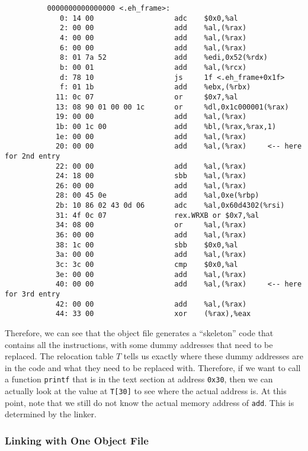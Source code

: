 \begin{enumerate}
\begin{lstlisting}
          0000000000000000 <.eh_frame>:
             0:	14 00                	adc    $0x0,%al
             2:	00 00                	add    %al,(%rax)
             4:	00 00                	add    %al,(%rax)
             6:	00 00                	add    %al,(%rax)
             8:	01 7a 52             	add    %edi,0x52(%rdx)
             b:	00 01                	add    %al,(%rcx)
             d:	78 10                	js     1f <.eh_frame+0x1f>
             f:	01 1b                	add    %ebx,(%rbx)
            11:	0c 07                	or     $0x7,%al
            13:	08 90 01 00 00 1c    	or     %dl,0x1c000001(%rax)
            19:	00 00                	add    %al,(%rax)
            1b:	00 1c 00             	add    %bl,(%rax,%rax,1)
            1e:	00 00                	add    %al,(%rax)
            20:	00 00                	add    %al,(%rax)     <-- here for 2nd entry
            22:	00 00                	add    %al,(%rax)
            24:	18 00                	sbb    %al,(%rax)
            26:	00 00                	add    %al,(%rax)
            28:	00 45 0e             	add    %al,0xe(%rbp)
            2b:	10 86 02 43 0d 06    	adc    %al,0x60d4302(%rsi)
            31:	4f 0c 07             	rex.WRXB or $0x7,%al
            34:	08 00                	or     %al,(%rax)
            36:	00 00                	add    %al,(%rax)
            38:	1c 00                	sbb    $0x0,%al
            3a:	00 00                	add    %al,(%rax)
            3c:	3c 00                	cmp    $0x0,%al
            3e:	00 00                	add    %al,(%rax)
            40:	00 00                	add    %al,(%rax)     <-- here for 3rd entry
            42:	00 00                	add    %al,(%rax)
            44:	33 00                	xor    (%rax),%eax
        \end{lstlisting}
      \end{enumerate}
      Therefore, we can see that the object file generates a ``skeleton'' code that contains all the instructions, with some dummy addresses that need to be replaced. The relocation table $T$ tells us exactly where these dummy addresses are in the code and what they need to be replaced with. Therefore, if we want to call a function \texttt{printf} that is in the text section at address \texttt{0x30}, then we can actually look at the value at \texttt{T[30]} to see where the actual address is. At this point, note that we still do not know the actual memory address of \texttt{add}. This is determined by the linker. 

    \subsubsection{Linking with One Object File}

